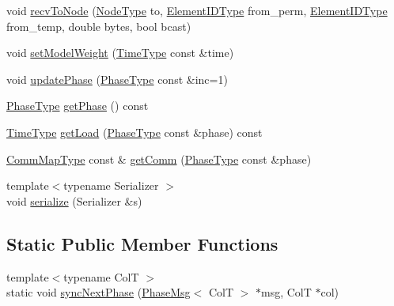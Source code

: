 \begin{DoxyCompactItemize}
\item 
void \hyperlink{structvt_1_1vrt_1_1collection_1_1balance_1_1_element_stats_aa7eb11ba5b2787b129925d9f2cd0ac89}{recv\+To\+Node} (\hyperlink{namespacevt_a866da9d0efc19c0a1ce79e9e492f47e2}{Node\+Type} to, \hyperlink{namespacevt_1_1vrt_1_1collection_1_1balance_a14c8d2c972f2913aa3f1636e5be0a120}{Element\+I\+D\+Type} from\+\_\+perm, \hyperlink{namespacevt_1_1vrt_1_1collection_1_1balance_a14c8d2c972f2913aa3f1636e5be0a120}{Element\+I\+D\+Type} from\+\_\+temp, double bytes, bool bcast)
\item 
void \hyperlink{structvt_1_1vrt_1_1collection_1_1balance_1_1_element_stats_aebacf2dd9e43b4886956741be1647d84}{set\+Model\+Weight} (\hyperlink{namespacevt_a876a9d0cd5a952859c72de8a46881442}{Time\+Type} const \&time)
\item 
void \hyperlink{structvt_1_1vrt_1_1collection_1_1balance_1_1_element_stats_a6ba8726a871702870d76dca6de298d07}{update\+Phase} (\hyperlink{structvt_1_1vrt_1_1collection_1_1balance_1_1_element_stats_a6edee983bb2ae96a341763520af33c66}{Phase\+Type} const \&inc=1)
\item 
\hyperlink{structvt_1_1vrt_1_1collection_1_1balance_1_1_element_stats_a6edee983bb2ae96a341763520af33c66}{Phase\+Type} \hyperlink{structvt_1_1vrt_1_1collection_1_1balance_1_1_element_stats_a24fcc0af9fb6017b556828a52431bc1c}{get\+Phase} () const
\item 
\hyperlink{namespacevt_a876a9d0cd5a952859c72de8a46881442}{Time\+Type} \hyperlink{structvt_1_1vrt_1_1collection_1_1balance_1_1_element_stats_aeb819ff1258eda6a7a1ccbd51b256731}{get\+Load} (\hyperlink{structvt_1_1vrt_1_1collection_1_1balance_1_1_element_stats_a6edee983bb2ae96a341763520af33c66}{Phase\+Type} const \&phase) const
\item 
\hyperlink{namespacevt_1_1vrt_1_1collection_1_1balance_aa50d4cbbfa3c643e7303fc6e08f411fb}{Comm\+Map\+Type} const  \& \hyperlink{structvt_1_1vrt_1_1collection_1_1balance_1_1_element_stats_a917ec0f6f274acc254c24c01fa66afa6}{get\+Comm} (\hyperlink{structvt_1_1vrt_1_1collection_1_1balance_1_1_element_stats_a6edee983bb2ae96a341763520af33c66}{Phase\+Type} const \&phase)
\item 
{\footnotesize template$<$typename Serializer $>$ }\\void \hyperlink{structvt_1_1vrt_1_1collection_1_1balance_1_1_element_stats_a2a329a760a794097651a78157cf12452}{serialize} (Serializer \&s)
\end{DoxyCompactItemize}
\subsection*{Static Public Member Functions}
\begin{DoxyCompactItemize}
\item 
{\footnotesize template$<$typename ColT $>$ }\\static void \hyperlink{structvt_1_1vrt_1_1collection_1_1balance_1_1_element_stats_a8238b75b708497ec5969235c52b2d338}{sync\+Next\+Phase} (\hyperlink{namespacevt_1_1vrt_1_1collection_1_1balance_a7120dc064f6e8c4157a5f4c81b825393}{Phase\+Msg}$<$ ColT $>$ $\ast$msg, ColT $\ast$col)
\end{DoxyCompactItemize}
